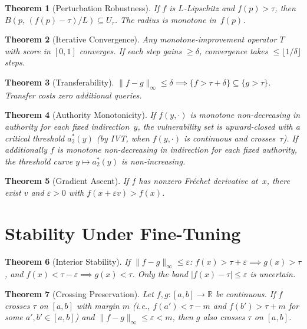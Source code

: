 \documentclass{article}
\newtheorem{theorem}{Theorem}[section]
\newcommand{\R}{\mathbb{R}}
\begin{document}
\begin{theorem}[Perturbation Robustness]
\label{thm:lipschitz}
If $f$ is $L$-Lipschitz and $f(p)>\tau$, then
$B(p,\, (f(p)-\tau)/L) \subseteq U_\tau$.
The radius is monotone in~$f(p)$.
\end{theorem}

\begin{theorem}[Iterative Convergence]
\label{thm:convergence}
Any monotone-improvement operator $T$ with score in $[0,1]$ converges.
If each step gains $\geq \delta$, convergence takes
$\leq \lfloor 1/\delta \rfloor$ steps.
\end{theorem}

\begin{theorem}[Transferability]
\label{thm:transfer}
$\|f-g\|_\infty \leq \delta \implies
\{f > \tau+\delta\} \subseteq \{g > \tau\}$.
Transfer costs zero additional queries.
\end{theorem}

\begin{theorem}[Authority Monotonicity]
\label{thm:authority}
If $f(y,\cdot)$ is monotone non-decreasing in authority for each fixed
indirection~$y$, the vulnerability set is upward-closed with a critical
threshold $a^*_2(y)$ (by IVT, when $f(y,\cdot)$ is continuous and
crosses~$\tau$). If additionally $f$ is monotone non-decreasing in
indirection for each fixed authority, the threshold curve
$y \mapsto a^*_2(y)$ is non-increasing.
\end{theorem}

\begin{theorem}[Gradient Ascent]
\label{thm:gradient}
If $f$ has nonzero Fr\'{e}chet derivative at~$x$, there exist $v$ and
$\varepsilon > 0$ with $f(x + \varepsilon v) > f(x)$.
\end{theorem}


\section{Stability Under Fine-Tuning}
\label{app:stability}

\begin{theorem}[Interior Stability]
\label{thm:interior-stable}
If $\|f - g\|_\infty \leq \varepsilon$:
$f(x) > \tau + \varepsilon \implies g(x) > \tau$, and
$f(x) < \tau - \varepsilon \implies g(x) < \tau$.
Only the band $|f(x) - \tau| \leq \varepsilon$ is uncertain.
\end{theorem}

\begin{theorem}[Crossing Preservation]
\label{thm:crossing}
Let $f, g\colon [a,b] \to \R$ be continuous. If $f$ crosses $\tau$
on $[a,b]$ with margin $m$ (i.e., $f(a') < \tau - m$ and
$f(b') > \tau + m$ for some $a', b' \in [a,b]$) and
$\|f - g\|_\infty \leq \varepsilon < m$, then $g$ also crosses
$\tau$ on $[a,b]$.
\end{theorem}
\end{document}
